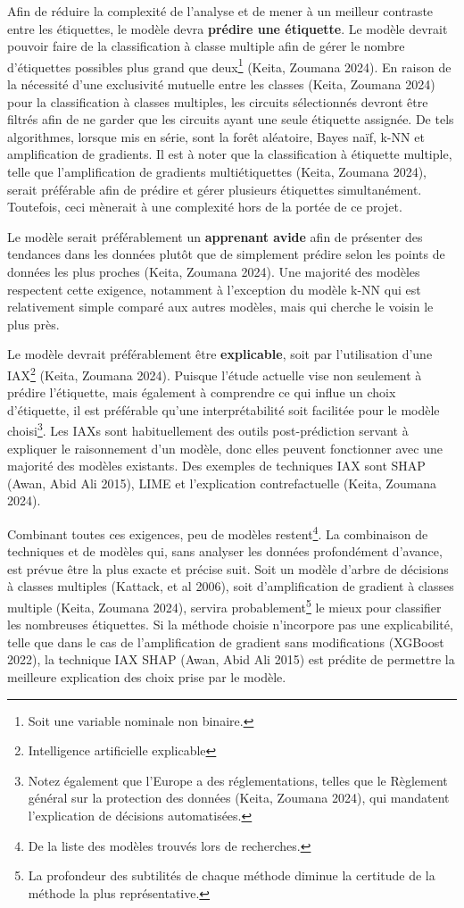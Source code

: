 \documentclass[
  oneside,
  open=any]{scrreprt}
\begin{document}
Afin de réduire la complexité de l'analyse et de mener à un meilleur
contraste entre les étiquettes, le modèle devra
\textbf{prédire une étiquette}. Le modèle devrait pouvoir faire de la
classification à classe multiple afin de gérer le nombre d'étiquettes
possibles plus grand que deux\footnote{Soit une variable nominale non
  binaire.} (Keita, Zoumana 2024). En raison de la nécessité d'une
exclusivité mutuelle entre les classes (Keita, Zoumana 2024) pour la
classification à classes multiples, les circuits sélectionnés devront
être filtrés afin de ne garder que les circuits ayant une seule
étiquette assignée. De tels algorithmes, lorsque mis en série, sont la
forêt aléatoire, Bayes naïf, k-NN et amplification de gradients. Il est
à noter que la classification à étiquette multiple, telle que
l'amplification de gradients multiétiquettes (Keita, Zoumana 2024),
serait préférable afin de prédire et gérer plusieurs étiquettes
simultanément. Toutefois, ceci mènerait à une complexité hors de la
portée de ce projet.

Le modèle serait préférablement un \textbf{apprenant avide} afin de
présenter des tendances dans les données plutôt que de simplement
prédire selon les points de données les plus proches (Keita, Zoumana
2024). Une majorité des modèles respectent cette exigence, notamment à
l'exception du modèle k-NN qui est relativement simple comparé aux
autres modèles, mais qui cherche le voisin le plus près.

Le modèle devrait préférablement être \textbf{explicable}, soit par
l'utilisation d'une IAX\footnote{Intelligence artificielle explicable}
(Keita, Zoumana 2024). Puisque l'étude actuelle vise non seulement à
prédire l'étiquette, mais également à comprendre ce qui influe un choix
d'étiquette, il est préférable qu'une interprétabilité soit facilitée
pour le modèle choisi\footnote{Notez également que l'Europe a des
  réglementations, telles que le Règlement général sur la protection des
  données (Keita, Zoumana 2024), qui mandatent l'explication de
  décisions automatisées.}. Les IAXs sont habituellement des outils
post-prédiction servant à expliquer le raisonnement d'un modèle, donc
elles peuvent fonctionner avec une majorité des modèles existants. Des
exemples de techniques IAX sont SHAP (Awan, Abid Ali 2015), LIME et
l'explication contrefactuelle (Keita, Zoumana 2024).

Combinant toutes ces exigences, peu de modèles restent\footnote{De la
  liste des modèles trouvés lors de recherches.}. La combinaison de
techniques et de modèles qui, sans analyser les données profondément
d'avance, est prévue être la plus exacte et précise suit. Soit un modèle
d'arbre de décisions à classes multiples (Kattack, et al 2006), soit
d'amplification de gradient à classes multiple (Keita, Zoumana 2024),
servira probablement\footnote{La profondeur des subtilités de chaque
  méthode diminue la certitude de la méthode la plus représentative.} le
mieux pour classifier les nombreuses étiquettes. Si la méthode choisie
n'incorpore pas une explicabilité, telle que dans le cas de
l'amplification de gradient sans modifications (XGBoost 2022), la
technique IAX SHAP (Awan, Abid Ali 2015) est prédite de permettre la
meilleure explication des choix prise par le modèle.
\end{document}
